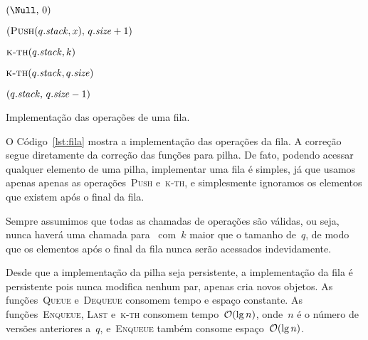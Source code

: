 \documentclass[quali.tex]{subfile}
\begin{document}
\begin{algorithm}
\begin{algorithmic}[1]
    \State \Return $(\Null,\,0)$
\EndFunction

    \State \Return $(\Call{Push}{q.\V{stack}, x},\,q.\V{size} + 1)$
\EndFunction

    \State \Return $\Call{k-th}{q.\V{stack}, k}$ 
\EndFunction

    \State \Return $\Call{k-th}{q.\V{stack}, q.\V{size}}$
\EndFunction

    \State \Return $(q.\mathit{stack},\,q.\mathit{size} - 1)$
\EndFunction

\end{algorithmic}
\caption{Implementação das operações de uma fila.} \label{lst:fila}
\end{algorithm}

O Código~\ref{lst:fila} mostra a implementação das operações da fila. A correção segue diretamente da correção das funções para pilha. De fato, podendo acessar qualquer elemento de uma pilha, implementar uma fila é simples, já que usamos apenas apenas as operações~\textsc{Push} e~\textsc{k-th}, e simplesmente ignoramos os elementos que existem após o final da fila.

Sempre assumimos que todas as chamadas de operações são válidas, ou seja, nunca haverá uma chamada para~ com~$k$ maior que o tamanho de~$q$, de modo que os elementos após o final da fila nunca serão acessados indevidamente.

Desde que a implementação da pilha seja persistente, a implementação da fila é persistente pois nunca modifica nenhum par, apenas cria novos objetos. As funções~\textsc{Queue} e~\textsc{Dequeue} consomem tempo e espaço constante. As funções~\textsc{Enqueue}, \textsc{Last} e~\textsc{k-th} consomem tempo~$\mathcal{O}(\lg n)$, onde~$n$ é o número de versões anteriores a~$q$, e~\textsc{Enqueue} também consome espaço~$\mathcal{O}(\lg n)$.
\end{document}
